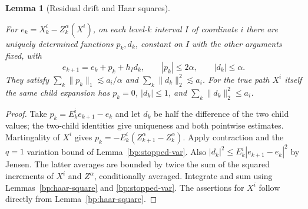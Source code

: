\documentclass[11pt,letterpaper]{article}
\newtheorem{lemma}[theorem]{Lemma}
\theoremstyle{definition}
\newcommand{\norm}[1]{\lVert#1\rVert}
\providecommand{\lean}[1]{}
\providecommand{\uses}[1]{}
\begin{document}
\begin{lemma}[Residual drift and Haar squares]\label{bp:residual-drift}
\lean{TwistedParaproduct.residualDrift}
For \(e_k=X^i_k-Z^\alpha_k(X^i)\), on each level-\(k\) interval
\(I\) of coordinate \(i\) there are uniquely determined functions
\(p_k,d_k\), constant on \(I\) with the other arguments fixed, with
\[
  e_{k+1}=e_k+p_k+h_I d_k,\qquad
  |p_k|\le2\alpha,\qquad |d_k|\le\alpha .
\]
They satisfy \(\sum_k\norm{p_k}_1\lesssim a_i/\alpha\) and
\(\sum_k\norm{d_k}_2^2\lesssim a_i\).
For the true path \(X^i\) itself the same child expansion has \(p_k=0\),
\(|d_k|\le1\), and \(\sum_k\norm{d_k}_2^2\le a_i\).
\end{lemma}
\begin{proof}
\uses{bp:stopped-var,bp:haar-square}
Take \(p_k=E_k^i e_{k+1}-e_k\) and let \(d_k\) be half the
difference of the two child values; the two-child identities give
uniqueness and both pointwise estimates. Martingality of \(X^i\)
gives \(p_k=-E_k^i(Z^\alpha_{k+1}-Z^\alpha_k)\). Apply contraction
and the \(q=1\) variation bound of Lemma~\ref{bp:stopped-var}.
Also \(|d_k|^2\le E_k^i|e_{k+1}-e_k|^2\) by Jensen. The latter
averages are bounded by twice the sum of the squared increments of
\(X^i\) and \(Z^\alpha\), conditionally averaged. Integrate and sum
using Lemmas~\ref{bp:haar-square} and \ref{bp:stopped-var}. The
assertions for \(X^i\) follow directly from Lemma~\ref{bp:haar-square}.
\end{proof}
\end{document}
